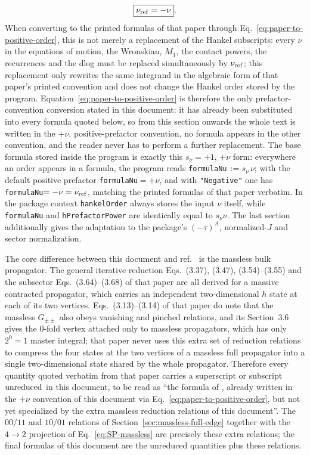 \documentclass[11pt,a4paper]{article}
\begin{document}
\begin{equation}
 \boxed{\nu_{\rm ref}=-\nu}.
 \label{eq:paper-to-positive-order}
\end{equation}
When converting to the printed formulas of that paper through Eq.~\eqref{eq:paper-to-positive-order}, this is not merely a replacement of the Hankel subscripts: every $\nu$ in the equations of motion, the Wronskian, $M_1$, the contact powers, the recurrences and the dlog must be replaced simultaneously by $\nu_{\rm ref}$; this replacement only rewrites the same integrand in the algebraic form of that paper's printed convention and does not change the Hankel order stored by the program. Equation~\eqref{eq:paper-to-positive-order} is therefore the only prefactor-convention conversion stated in this document: it has already been substituted into every formula quoted below, so from this section onwards the whole text is written in the $+\nu$, positive-prefactor convention, no formula appears in the other convention, and the reader never has to perform a further replacement. The base formula stored inside the program is exactly this $s_\nu=+1$, $+\nu$ form: everywhere an order appears in a formula, the program reads \texttt{formulaNu}$\,:=s_\nu\,\nu$; with the default positive prefactor \texttt{formulaNu}$=+\nu$, and with \texttt{"Negative"} one has \texttt{formulaNu}$=-\nu=\nu_{\rm ref}$, matching the printed formulas of that paper verbatim. In the package context \texttt{hankelOrder} always stores the input $\nu$ itself, while \texttt{formulaNu} and \texttt{hPrefactorPower} are identically equal to $s_\nu\nu$. The last section additionally gives the adaptation to the package's $(-\tau)^A$, normalized-$J$ and sector normalization.

The core difference between this document and ref.~\cite{Chen:2023eic} is the massless bulk propagator. The general iterative reduction Eqs.~(3.37), (3.47), (3.54)--(3.55) and the subsector Eqs.~(3.64)--(3.68) of that paper are all derived for a massive contracted propagator, which carries an independent two-dimensional $h$ state at each of its two vertices. Eqs.~(3.13)--(3.14) of that paper do note that the massless $G_{\pm\pm}$ also obeys vanishing and pinched relations, and its Section~3.6 gives the 0-fold vertex attached only to massless propagators, which has only $2^0=1$ master integral; that paper never uses this extra set of reduction relations to compress the four states at the two vertices of a massless full propagator into a single two-dimensional state shared by the whole propagator. Therefore every quantity quoted verbatim from that paper carries a superscript or subscript ${\rm unreduced}$ in this document, to be read as ``the formula of \cite{Chen:2023eic}, already written in the $+\nu$ convention of this document via Eq.~\eqref{eq:paper-to-positive-order}, but not yet specialized by the extra massless reduction relations of this document''. The $00/11$ and $10/01$ relations of Section~\ref{sec:massless-full-edge} together with the $4\to2$ projection of Eq.~\eqref{eq:SP-massless} are precisely these extra relations; the final formulas of this document are the unreduced quantities plus these relations.
\end{document}
